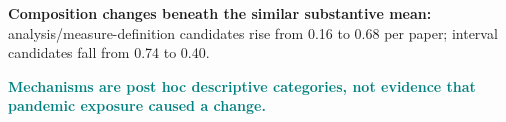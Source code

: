\smalltext
\textbf{Composition changes beneath the similar substantive mean:} analysis/measure-definition candidates rise from 0.16 to 0.68 per paper; interval candidates fall from 0.74 to 0.40.\par\medskip
\textcolor{Teal}{\textbf{Mechanisms are post hoc descriptive categories, not evidence that pandemic exposure caused a change.}}
